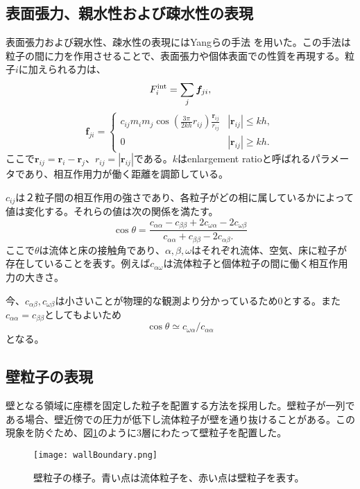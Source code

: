 \documentclass[]{jsarticle}
\begin{document}
\subsection{表面張力、親水性および疎水性の表現}
表面張力および親水性、疎水性の表現にはYangらの手法 \cite{Yang2016, Yang2017}を用いた。この手法は粒子の間に力を作用させることで、表面張力や個体表面での性質を再現する。粒子$i$に加えられる力は、
\begin{equation}
F^{\rm{int}}_i=\sum_{j} \bm{f}_{ji},
\end{equation}
\begin{equation}
  \bm{f}_{ji}=\begin{cases}
    c_{ij}m_im_j\cos\left(\frac{3\pi}{2kh}r_{ij}\right)\frac{\bm{r}_{ij}}{r_{ij}} & \text{$|\bm{r}_{ij}|\leq kh,$}\\
    0 & \text{$|\bm{r}_{ij}|\geq kh.$}
\end{cases}
\end{equation}
ここで$\bm{r}_{ij}=\bm{r}_i-\bm{r}_{j}$、$r_{ij}=|\bm{r}_{ij}|$である。$k$はenlargement ratioと呼ばれるパラメータであり、相互作用力が働く距離を調節している。

$c_{ij}$は２粒子間の相互作用の強さであり、各粒子がどの相に属しているかによって値は変化する。それらの値は次の関係を満たす。
\begin{equation}
\cos\theta=\frac{c_{\alpha\alpha}-c_{\beta\beta}+2c_{\omega\alpha}-2c_{\omega\beta}}{c_{\alpha\alpha} +c_{\beta\beta} -2c_{\alpha\beta}.}
\end{equation}
ここで$\theta$は流体と床の接触角であり、$\alpha,\beta,\omega$はそれぞれ流体、空気、床に粒子が存在していることを表す。例えば$c_{\alpha\omega}$は流体粒子と個体粒子の間に働く相互作用力の大きさ。

今、$c_{\alpha\beta},c_{\omega\beta}$は小さいことが物理的な観測より分かっているため0とする。また$c_{\alpha\alpha}=c_{\beta\beta}$としてもよいため
\begin{equation}
\label{eqn:contactAngleSimplified}
  \cos\theta\simeq c_{\omega\alpha}/c_{\alpha\alpha}
\end{equation}
となる。

\subsection{壁粒子の表現}
壁となる領域に座標を固定した粒子を配置する方法を採用した。壁粒子が一列である場合、壁近傍での圧力が低下し流体粒子が壁を通り抜けることがある。この現象を防ぐため、図\ref{fig:wallParticles}のように3層にわたって壁粒子を配置した。
\begin{figure}[H]
  \centering
  \texttt{[image: wallBoundary.png]}
  \caption{壁粒子の様子。青い点は流体粒子を、赤い点は壁粒子を表す。}
  \label{fig:wallParticles} 
\end{figure}
\end{document}
